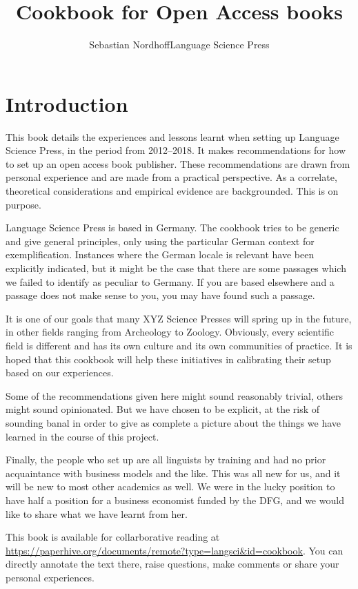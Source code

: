 \documentclass[nonflat,smallfont
]{langsci/langscibook}
\title{Cookbook for Open Access books}
\author{Sebastian Nordhoff\newlineCover Language Science Press}
\begin{document}
\maketitle 
\tableofcontents 
\mainmatter
\chapter{Introduction}
\largerpage
This book details the experiences and lessons learnt when setting up Language Science Press, in the period from 2012--2018. It makes recommendations for how to set up an open access book publisher. These recommendations are drawn from personal experience and are made from a practical perspective. As a correlate, theoretical considerations and empirical evidence are backgrounded. This is on purpose. 

Language Science Press is based in Germany. The cookbook tries to be generic and give general principles, only using the particular German context for exemplification. Instances where the German locale is relevant have been explicitly indicated, but it might be the case that there are some passages which we failed to identify as peculiar to Germany. If you are based elsewhere and a passage does not make sense to you, you may have found such a passage.
 

It is one of our goals that many XYZ Science Presses will spring up in the future, in other fields ranging from Archeology to Zoology. Obviously, every scientific field is different and has its own culture and its own communities of practice. It is hoped that this cookbook will help these initiatives in calibrating their setup based on our experiences. 

Some of the recommendations given here might sound reasonably trivial, others might sound opinionated. But we have chosen to be explicit, at the risk of sounding banal in order to give as complete a picture about the things we have learned in the course of this project.

Finally, the people who set up are all linguists by training and had no prior acquaintance with business models and the like. This was all new for us, and it will be new to most other academics as well. We were in the lucky position to have half a position for a business economist funded by the DFG, and we would like to share what we have learnt from her. 

This book is available for collarborative reading at \url{https://paperhive.org/documents/remote?type=langsci&id=cookbook}. You can directly annotate the text there, raise questions, make comments or share your personal experiences. 
\end{document}
